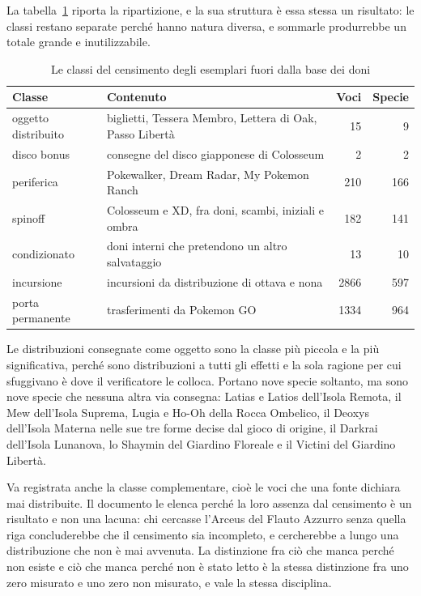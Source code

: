 La tabella~\ref{tab:classi-censimento} riporta la ripartizione, e la sua struttura è essa stessa un risultato: le classi restano separate perché hanno natura diversa, e sommarle produrrebbe un totale grande e inutilizzabile.

\begin{table}[htbp]
\centering
\caption{Le classi del censimento degli esemplari fuori dalla base dei doni}
\label{tab:classi-censimento}
\begin{tabular}{llrr}
\toprule
Classe & Contenuto & Voci & Specie \\
\midrule
oggetto distribuito & biglietti, Tessera Membro, Lettera di Oak, Passo Libertà & 15 & 9 \\
disco bonus & consegne del disco giapponese di Colosseum & 2 & 2 \\
periferica & Pokewalker, Dream Radar, My Pokemon Ranch & 210 & 166 \\
spinoff & Colosseum e XD, fra doni, scambi, iniziali e ombra & 182 & 141 \\
condizionato & doni interni che pretendono un altro salvataggio & 13 & 10 \\
incursione & incursioni da distribuzione di ottava e nona & 2866 & 597 \\
porta permanente & trasferimenti da Pokemon GO & 1334 & 964 \\
\bottomrule
\end{tabular}
\end{table}

Le distribuzioni consegnate come oggetto sono la classe più piccola e la più significativa, perché sono distribuzioni a tutti gli effetti e la sola ragione per cui sfuggivano è dove il verificatore le colloca. Portano nove specie soltanto, ma sono nove specie che nessuna altra via consegna: Latias e Latios dell'Isola Remota, il Mew dell'Isola Suprema, Lugia e Ho-Oh della Rocca Ombelico, il Deoxys dell'Isola Materna nelle sue tre forme decise dal gioco di origine, il Darkrai dell'Isola Lunanova, lo Shaymin del Giardino Floreale e il Victini del Giardino Libertà.

Va registrata anche la classe complementare, cioè le voci che una fonte dichiara mai distribuite. Il documento le elenca perché la loro assenza dal censimento è un risultato e non una lacuna: chi cercasse l'Arceus del Flauto Azzurro senza quella riga concluderebbe che il censimento sia incompleto, e cercherebbe a lungo una distribuzione che non è mai avvenuta. La distinzione fra ciò che manca perché non esiste e ciò che manca perché non è stato letto è la stessa distinzione fra uno zero misurato e uno zero non misurato, e vale la stessa disciplina.

